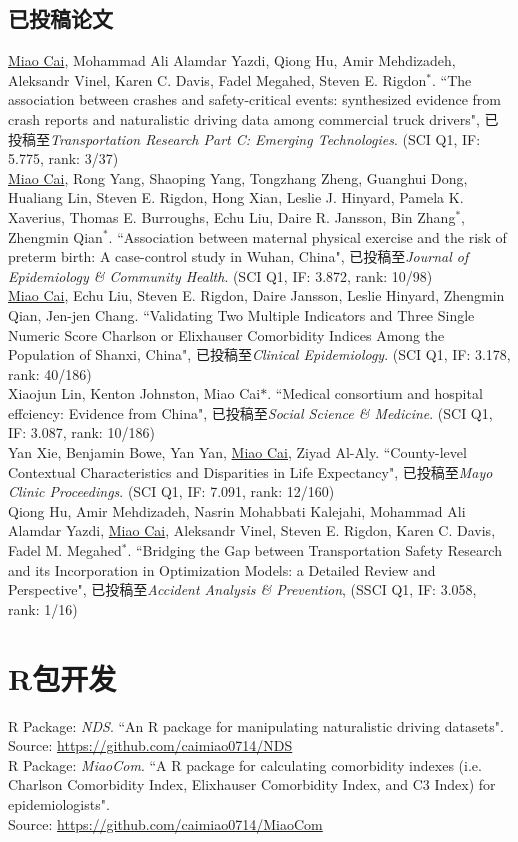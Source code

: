 \documentclass[11pt, a4paper]{article}
\newcommand{\years}[1]{\marginnote{\scriptsize #1}}
\begin{document}
\subsection*{已投稿论文}
\noindent
\years{2019}\underline{Miao Cai},  Mohammad Ali Alamdar Yazdi, Qiong Hu, Amir Mehdizadeh, Aleksandr Vinel, Karen C. Davis, Fadel Megahed, Steven E. Rigdon$^\ast$. ``The association between crashes and safety-critical events: synthesized evidence from crash reports and naturalistic driving data among commercial truck drivers", 已投稿至\emph{Transportation Research Part C: Emerging Technologies}. (SCI Q1, IF: 5.775, rank: 3/37)\\
\years{2019}\underline{Miao Cai}, Rong Yang, Shaoping Yang, Tongzhang Zheng, Guanghui Dong, Hualiang Lin, Steven E. Rigdon, Hong Xian, Leslie J. Hinyard, Pamela K. Xaverius, Thomas E. Burroughs, Echu Liu, Daire R. Jansson, Bin Zhang$^\ast$, Zhengmin Qian$^\ast$. ``Association between maternal physical exercise and the risk of preterm birth: A case-control study in Wuhan, China", 已投稿至\emph{Journal of Epidemiology \& Community Health}. (SCI Q1, IF: 3.872, rank: 10/98)\\
\years{2019}\underline{Miao Cai}, Echu Liu, Steven E. Rigdon, Daire Jansson, Leslie Hinyard, Zhengmin Qian, Jen-jen Chang. ``Validating Two Multiple Indicators and Three Single Numeric Score Charlson or Elixhauser Comorbidity Indices Among the Population of Shanxi, China", 已投稿至\emph{Clinical Epidemiology}. (SCI Q1, IF: 3.178, rank: 40/186)\\
Xiaojun Lin, Kenton Johnston, Miao Cai$*$. ``Medical consortium and hospital effciency: Evidence from China", 已投稿至\emph{Social Science \& Medicine}. (SCI Q1, IF: 3.087, rank: 10/186)\\
\years{2019}Yan Xie, Benjamin Bowe, Yan Yan, \underline{Miao Cai}, Ziyad Al-Aly. ``County-level Contextual Characteristics and Disparities in Life Expectancy", 已投稿至\emph{Mayo Clinic Proceedings}. (SCI Q1, IF: 7.091, rank: 12/160)\\
\years{2019}Qiong Hu, Amir Mehdizadeh, Nasrin Mohabbati Kalejahi, Mohammad Ali Alamdar Yazdi, \underline{Miao Cai}, Aleksandr Vinel, Steven E. Rigdon, Karen C. Davis, Fadel M. Megahed$^\ast$. ``Bridging the Gap between Transportation Safety Research and its Incorporation in Optimization Models: a Detailed Review and Perspective", 已投稿至\emph{Accident Analysis \& Prevention}, (SSCI Q1, IF: 3.058, rank: 1/16)



\section*{R包开发}
\years{2019}R Package: \emph{NDS}. ``An R package for manipulating naturalistic driving datasets".\\ Source: \href{https://github.com/caimiao0714/NDS}{https://github.com/caimiao0714/NDS}\\
\years{2017}R Package: \emph{MiaoCom}. ``A R package for calculating comorbidity indexes (i.e. Charlson Comorbidity Index, Elixhauser Comorbidity Index, and C3 Index) for epidemiologists".\\ Source: \href{https://github.com/caimiao0714/MiaoCom}{https://github.com/caimiao0714/MiaoCom}
\end{document}
